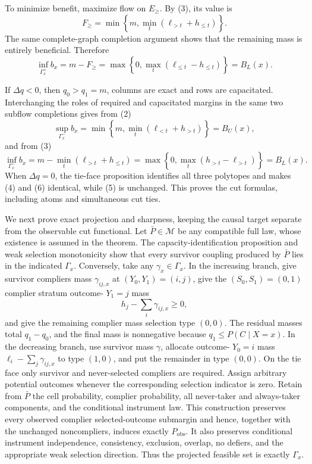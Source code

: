 To minimize benefit, maximize flow on \(E_{\ge}\).  By (3), its value is
\[
F_{\ge}=\min\left\{m,\min_t(\ell_{>t}+h_{\le t})\right\}.
\]
The same complete-graph completion argument shows that the remaining mass is entirely beneficial.  Therefore
\[
\inf_{\Gamma_x^+}b_x
=m-F_{\ge}
=\max\left\{0,\max_t(\ell_{\le t}-h_{\le t})\right\}=B_L(x).
\tag{4}
\]

If \(\Delta q<0\), then \(q_0>q_1=m\), columns are exact and rows are capacitated.  Interchanging the roles of required and capacitated margins in the same two subflow completions gives from (2)
\[
\sup_{\Gamma_x^-}b_x
=\min\left\{m,\min_t(\ell_{<t}+h_{>t})\right\}=B_U(x),
\tag{5}
\]
and from (3)
\[
\inf_{\Gamma_x^-}b_x
=m-\min_t(\ell_{>t}+h_{\le t})
=\max\left\{0,\max_t(h_{>t}-\ell_{>t})\right\}=B_L(x).
\tag{6}
\]
When \(\Delta q=0\), the tie-face proposition identifies all three polytopes and makes (4) and (6) identical, while (5) is unchanged.  This proves the cut formulas, including atoms and simultaneous cut ties.

We next prove exact projection and sharpness, keeping the causal target separate from the observable cut functional.  Let \(\bar P\in\mathcal M\) be any compatible full law, whose existence is assumed in the theorem.  The capacity-identification proposition and weak selection monotonicity show that every survivor coupling produced by \(\bar P\) lies in the indicated \(\Gamma_x\).  Conversely, take any \(\gamma_x\in\Gamma_x\).  In the increasing branch, give survivor compliers mass \(\gamma_{ij,x}\) at \((Y_0,Y_1)=(i,j)\), give the \((S_0,S_1)=(0,1)\) complier stratum outcome-
\(Y_1=j\) mass
\[
h_j-\sum_i\gamma_{ij,x}\ge0,
\]
and give the remaining complier mass selection type \((0,0)\).  The residual masses total \(q_1-q_0\), and the final mass is nonnegative because \(q_1\le P(C\mid X=x)\).  In the decreasing branch, use survivor mass \(\gamma\), allocate outcome-
\(Y_0=i\) mass \(\ell_i-\sum_j\gamma_{ij,x}\) to type \((1,0)\), and put the remainder in type \((0,0)\).  On the tie face only survivor and never-selected compliers are required.  Assign arbitrary potential outcomes whenever the corresponding selection indicator is zero.  Retain from \(\bar P\) the cell probability, complier probability, all never-taker and always-taker components, and the conditional instrument law.  This construction preserves every observed complier selected-outcome submargin and hence, together with the unchanged noncompliers, induces exactly \(P_{\mathrm{obs}}\).  It also preserves conditional instrument independence, consistency, exclusion, overlap, no defiers, and the appropriate weak selection direction.  Thus the projected feasible set is exactly \(\Gamma_x\).

